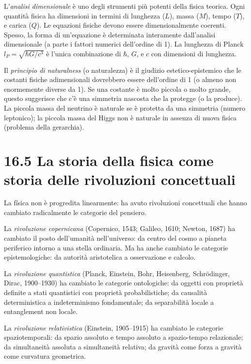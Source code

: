 \documentclass[11.5pt,a4paper,openany]{book}
\theoremstyle{remark}
\begin{document}
L'\textit{analisi dimensionale} è uno degli strumenti più potenti della fisica teorica. Ogni quantità fisica ha dimensioni in termini di lunghezza ($L$), massa ($M$), tempo ($T$), e carica ($Q$). Le equazioni fisiche devono essere dimensionalmente coerenti. Spesso, la forma di un'equazione è determinata interamente dall'analisi dimensionale (a parte i fattori numerici dell'ordine di 1). La lunghezza di Planck $l_P = \sqrt{\hbar G/c^3}$ è l'unica combinazione di $\hbar$, $G$, e $c$ con dimensioni di lunghezza.

Il \textit{principio di naturalness} (o naturalezza) è il giudizio estetico-epistemico che le costanti fisiche adimensionali dovrebbero essere dell'ordine di 1 (o almeno non enormemente diverse da 1). Se una costante è molto piccola o molto grande, questo suggerisce che c'è una simmetria nascosta che la protegge (o la produce). La piccola massa del neutrino è naturale se è protetta da una simmetria (numero leptonico); la piccola massa del Higgs non è naturale in assenza di nuova fisica (problema della gerarchia).

\section{16.5 La storia della fisica come storia delle rivoluzioni concettuali}

La física non è progredita linearmente: ha avuto rivoluzioni concettuali che hanno cambiato radicalmente le categorie del pensiero.

La \textit{rivoluzione copernicana} (Copernico, 1543; Galileo, 1610; Newton, 1687) ha cambiato il posto dell'umanità nell'universo: da centro del cosmo a pianeta periferico intorno a una stella ordinaria. Ma ha anche cambiato le categorie epistemologiche: da autorità aristotelica a osservazione e calcolo.

La \textit{rivoluzione quantistica} (Planck, Einstein, Bohr, Heisenberg, Schrödinger, Dirac, 1900--1930) ha cambiato le categorie ontologiche: da oggetti con proprietà definite a stati quantistici con proprietà probabilistiche; da causalità deterministica a indeterminismo fondamentale; da separabilità locale a entanglement non locale.

La \textit{rivoluzione relativistica} (Einstein, 1905--1915) ha cambiato le categorie spaziotemporali: da spazio assoluto e tempo assoluto a spazio-tempo relazionale; da simultaneità assoluta a simultaneità relativa; da gravità come forza a gravità come curvatura geometrica.
\end{document}
